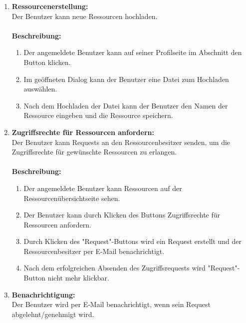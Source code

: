 \documentclass[parskip=full,11pt]{scrartcl}
\def\threedigits#1{%
  \ifnum#1<10 0\fi
  \ifnum#1<1 0\fi
  \number#1}
\begin{document}
\begin{enumerate}[label={\textbf{/F\protect\threedigits{\theenumi}0/}}, leftmargin=*]
\begin{enumerate}[label=(\arabic*), leftmargin=*]
\item Der Benutzer kann Inhalt der Ressourcen, für die er Zugriffsrechte hat, durch Klicken des Buttons \grqq ansehen.
\item Der Benutzer kann von Ressourcen, für die er keine Zugriffsrechte hat, ausschließlich Metadaten sehen.
\end{enumerate}
\item \label{FAB4} \textbf{Ressourcenerstellung:}\\ Der Benutzer kann neue Ressourcen hochladen.\\\\
\textbf{Beschreibung:}\\
\begin{enumerate}[label=(\arabic*), leftmargin=*]
\item Der angemeldete Benutzer kann auf seiner Profilseite im Abschnitt \grqq den Button \grqq klicken.
\item Im geöffneten Dialog kann der Benutzer eine Datei zum Hochladen auswählen.
\item Nach dem Hochladen der Datei kann der Benutzer den Namen der Ressource eingeben und die Ressource speichern.  
\end{enumerate}
\item \label{FAB5} \textbf{Zugriffsrechte für Ressourcen anfordern:}\\ Der Benutzer kann Requests an den Ressourcenbesitzer senden, um die Zugriffsrechte für gewünschte Ressourcen zu erlangen.\\\\
\textbf{Beschreibung:}\\
\begin{enumerate}[label=(\arabic*), leftmargin=*]
\item Der angemeldete Benutzer kann Ressourcen auf der Ressourcenübersichtseite sehen.
\item Der Benutzer kann durch Klicken des Buttons \grqq Zugriffsrechte für Ressourcen anfordern.
\item Durch Klicken des "Request"-Buttons wird ein Request erstellt und der Ressourcenbesitzer per E-Mail benachrichtigt.
\item Nach dem erfolgreichen Absenden des Zugriffsrequests wird "Request"-Button nicht mehr klickbar.
\end{enumerate}
\newpage
\item \label{FAB6} \textbf{Benachrichtigung:}\\ Der Benutzer wird per E-Mail benachrichtigt, wenn sein Request abgelehnt/genehmigt wird.\\\\

\end{enumerate}
\end{document}
